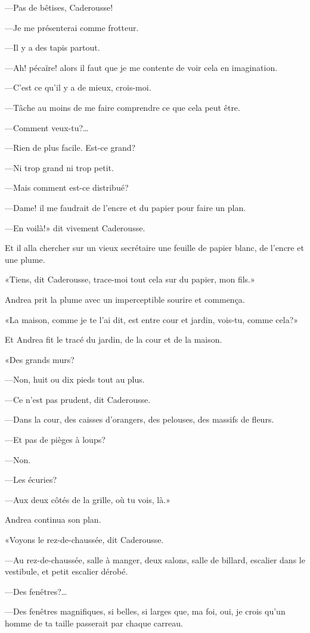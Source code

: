 —Pas de bêtises, Caderousse! 

—Je me présenterai comme frotteur. 

—Il y a des tapis partout. 

—Ah! pécaïre! alors il faut que je me contente de voir cela en imagination. 

—C'est ce qu'il y a de mieux, crois-moi. 

—Tâche au moins de me faire comprendre ce que cela peut être. 

—Comment veux-tu?\dots 

—Rien de plus facile. Est-ce grand? 

—Ni trop grand ni trop petit. 

—Mais comment est-ce distribué? 

—Dame! il me faudrait de l'encre et du papier pour faire un plan. 

—En voilà!» dit vivement Caderousse. 

Et il alla chercher sur un vieux secrétaire une feuille de papier blanc, de l'encre et une plume. 

«Tiens, dit Caderousse, trace-moi tout cela sur du papier, mon fils.» 

Andrea prit la plume avec un imperceptible sourire et commença. 

«La maison, comme je te l'ai dit, est entre cour et jardin, vois-tu, comme cela?» 

Et Andrea fit le tracé du jardin, de la cour et de la maison. 

«Des grands murs? 

—Non, huit ou dix pieds tout au plus. 

—Ce n'est pas prudent, dit Caderousse. 

—Dans la cour, des caisses d'orangers, des pelouses, des massifs de fleurs.  

—Et pas de pièges à loups? 

—Non. 

—Les écuries? 

—Aux deux côtés de la grille, où tu vois, là.» 

Andrea continua son plan. 

«Voyons le rez-de-chaussée, dit Caderousse. 

—Au rez-de-chaussée, salle à manger, deux salons, salle de billard, escalier dans le vestibule, et petit escalier dérobé. 

—Des fenêtres?\dots 

—Des fenêtres magnifiques, si belles, si larges que, ma foi, oui, je crois qu'un homme de ta taille passerait par chaque carreau. 

